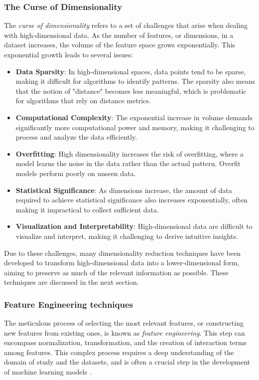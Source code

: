     \subsubsection{The Curse of Dimensionality}
    The \textit{curse of dimensionality} refers to a set of challenges that arise when dealing with high-dimensional data. As the number of features, or dimensions, in a dataset increases, the volume of the feature space grows exponentially. This exponential growth leads to several issues:

    \begin{itemize}
        \item \textbf{Data Sparsity}: In high-dimensional spaces, data points tend to be sparse, making it difficult for algorithms to identify patterns. The sparsity also means that the notion of "distance" becomes less meaningful, which is problematic for algorithms that rely on distance metrics.
        
        \item \textbf{Computational Complexity}: The exponential increase in volume demands significantly more computational power and memory, making it challenging to process and analyze the data efficiently.
        
        \item \textbf{Overfitting}: High dimensionality increases the risk of overfitting, where a model learns the noise in the data rather than the actual pattern. Overfit models perform poorly on unseen data.
        
        \item \textbf{Statistical Significance}: As dimensions increase, the amount of data required to achieve statistical significance also increases exponentially, often making it impractical to collect sufficient data.
        
        \item \textbf{Visualization and Interpretability}: High-dimensional data are difficult to visualize and interpret, making it challenging to derive intuitive insights.
    \end{itemize}

    Due to these challenges, many dimensionality reduction techniques have been developed to transform high-dimensional data into a lower-dimensional form, aiming to preserve as much of the relevant information as possible. These techniques are discussed in the next section.

    \subsubsection{Feature Engineering techniques}
    The meticulous process of selecting the most relevant features, or constructing new features from existing ones, is known as \textit{feature engineering}. This step can encompass normalization, transformation, and the creation of interaction terms among features. This complex process requires a deep understanding of the domain of study and the datasets, and is often a crucial step in the development of machine learning models \cite{FeatureEngineeringMadeEasy18}.

